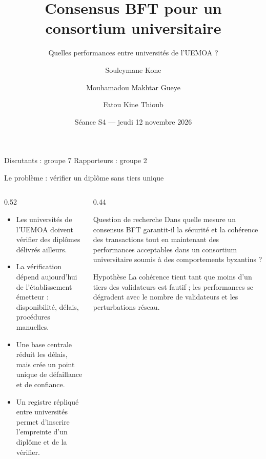 \documentclass[10pt,aspectratio=169]{beamer}
\title[Consensus BFT et consortium universitaire]{Consensus BFT pour un consortium universitaire}
\subtitle{Quelles performances entre universités de l'UEMOA ?}
\author[Groupe 3]{Souleymane Kone \and Mouhamadou Makhtar Gueye \and Fatou Kine Thioub}
\institute[ESP-UCAD / LITA]{ESP-UCAD --- Laboratoire LITA\\Cryptographie \& Technologies Blockchain}
\date{Séance S4 --- jeudi 12 novembre 2026}
\begin{document}
\begin{frame}[plain]
  \titlepage
  \vspace{-0.4cm}
  \begin{center}
    \footnotesize
    Discutants : groupe 7 \quad\textbullet\quad Rapporteurs : groupe 2
  \end{center}
\end{frame}

\begin{frame}{Le problème : vérifier un diplôme sans tiers unique}
  \begin{columns}[T,onlytextwidth]
    \begin{column}{0.52\textwidth}
      \begin{itemize}
        \item Les universités de l'UEMOA doivent vérifier des diplômes délivrés ailleurs.
        \item La vérification dépend aujourd'hui de l'établissement émetteur : disponibilité, délais, procédures manuelles.
        \item Une base centrale réduit les délais, mais crée un point unique de défaillance et de confiance.
        \item Un registre répliqué entre universités permet d'inscrire l'empreinte d'un diplôme et de la vérifier.
      \end{itemize}
    \end{column}
    \begin{column}{0.44\textwidth}
      \begin{block}{Question de recherche}
        \small
        Dans quelle mesure un consensus BFT garantit-il la sécurité et la cohérence des transactions tout en maintenant des performances acceptables dans un consortium universitaire soumis à des comportements byzantins ?
      \end{block}
      \begin{block}{Hypothèse}
        \small
        La cohérence tient tant que moins d'un tiers des validateurs est fautif ; les performances se dégradent avec le nombre de validateurs et les perturbations réseau.
      \end{block}
    \end{column}
  \end{columns}
\end{frame}
\end{document}
